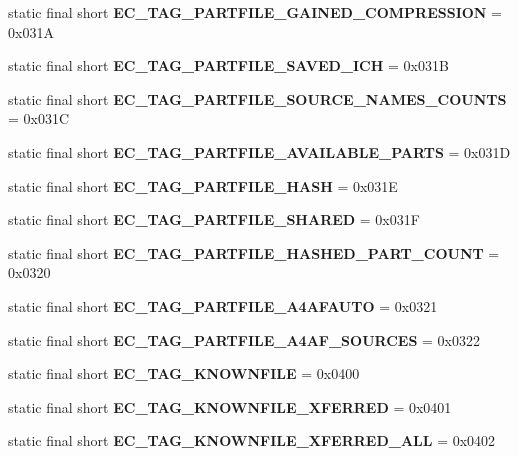 \begin{DoxyCompactItemize}
\item 
static final short {\bfseries EC\_\-TAG\_\-PARTFILE\_\-GAINED\_\-COMPRESSION} = 0x031A\label{interfaceECCodes_ac307211bdc448d1be8a381fd789c7198}

\item 
static final short {\bfseries EC\_\-TAG\_\-PARTFILE\_\-SAVED\_\-ICH} = 0x031B\label{interfaceECCodes_a32593533ee206f31bc4365dbc3beacca}

\item 
static final short {\bfseries EC\_\-TAG\_\-PARTFILE\_\-SOURCE\_\-NAMES\_\-COUNTS} = 0x031C\label{interfaceECCodes_a28df0c1c46aec2dc6bc13e94a44ac4ab}

\item 
static final short {\bfseries EC\_\-TAG\_\-PARTFILE\_\-AVAILABLE\_\-PARTS} = 0x031D\label{interfaceECCodes_ab6bcd1942cf1cb3bcb4deec5b190b32b}

\item 
static final short {\bfseries EC\_\-TAG\_\-PARTFILE\_\-HASH} = 0x031E\label{interfaceECCodes_a56b27a24eee21a0fa6d5b36eeef5562c}

\item 
static final short {\bfseries EC\_\-TAG\_\-PARTFILE\_\-SHARED} = 0x031F\label{interfaceECCodes_aa036da865b34f0acfe44021b844da045}

\item 
static final short {\bfseries EC\_\-TAG\_\-PARTFILE\_\-HASHED\_\-PART\_\-COUNT} = 0x0320\label{interfaceECCodes_adc1faaa633b573b980729981d2f8d6e4}

\item 
static final short {\bfseries EC\_\-TAG\_\-PARTFILE\_\-A4AFAUTO} = 0x0321\label{interfaceECCodes_a7b9a9156b7202ed3fde6f4f641630c9f}

\item 
static final short {\bfseries EC\_\-TAG\_\-PARTFILE\_\-A4AF\_\-SOURCES} = 0x0322\label{interfaceECCodes_af4d891b9987196e21721ce9b08328ed7}

\item 
static final short {\bfseries EC\_\-TAG\_\-KNOWNFILE} = 0x0400\label{interfaceECCodes_a7287a9e715b75009100cf0b4c6a29aec}

\item 
static final short {\bfseries EC\_\-TAG\_\-KNOWNFILE\_\-XFERRED} = 0x0401\label{interfaceECCodes_a2dba4428c3d4b509914d7fcd80ea6691}

\item 
static final short {\bfseries EC\_\-TAG\_\-KNOWNFILE\_\-XFERRED\_\-ALL} = 0x0402\label{interfaceECCodes_a09a68ea44e06e18d6659615c737c55ee}


\end{DoxyCompactItemize}
